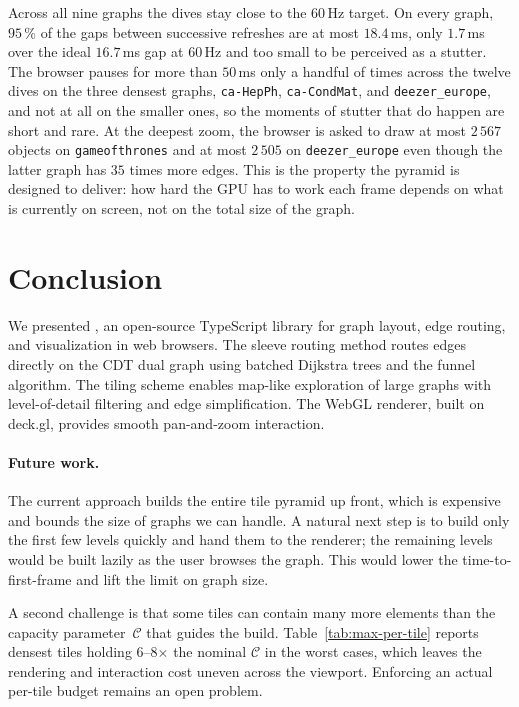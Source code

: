 \documentclass[a4paper,USenglish,anonymous]{gd-lipics-v3}
\newcommand{\msagljs}{\textsf{\libname}}
\begin{document}
Across all nine graphs the dives stay close to the $60$\,Hz target.
On every graph, $95\,\%$ of the gaps between successive refreshes
are at most $18.4$\,ms, only $1.7$\,ms over the ideal $16.7$\,ms gap
at $60$\,Hz and too small to be perceived as a stutter. The
browser pauses for more than $50$\,ms only a handful of times across
the twelve dives on the three densest graphs, \texttt{ca-HepPh},
\texttt{ca-CondMat}, and \texttt{deezer\_europe}, and not at all on
the smaller ones, so the moments of stutter that do happen are short
and rare. At the deepest zoom, the browser is asked to draw at most
$2\,567$ objects on \texttt{gameofthrones} and at most $2\,505$ on
\texttt{deezer\_europe} even though the latter graph has $35$ times
more edges. This is the property the pyramid is designed to deliver:
how hard the GPU has to work each frame depends on what is currently
on screen, not on the total size of the graph.

\section{Conclusion}
\label{sec:conclusion}

We presented \msagljs{}, an open-source TypeScript library for graph layout, edge routing, and visualization in web browsers. The sleeve routing method routes edges directly on the CDT dual graph using batched Dijkstra trees and the funnel algorithm. The tiling scheme enables map-like exploration of large graphs with level-of-detail filtering and edge simplification. The WebGL renderer, built on deck.gl, provides smooth pan-and-zoom interaction.

\paragraph{Future work.} The current approach builds the entire tile
pyramid up front, which is expensive and bounds the size of graphs we
can handle. A natural next step is to build only the first few levels
quickly and hand them to the renderer; the remaining levels would be
built lazily as the user browses the graph. This
would lower the time-to-first-frame and lift the limit on graph size.

A second challenge is that some tiles can contain many more
elements than the capacity parameter~$\mathcal{C}$ that guides the
build. Table~\ref{tab:max-per-tile} reports densest tiles holding
6--8$\times$ the nominal $\mathcal{C}$ in the worst cases, which leaves
the rendering and interaction cost uneven across the viewport.
Enforcing an actual per-tile budget remains an open problem.


\end{document}
